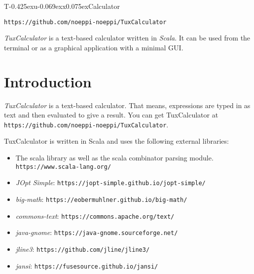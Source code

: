 \documentclass[10pt]{article}
\let\~=\allowbreak
\begin{document}
    \begin{center}
        {\Huge\fontsize{37pt}{37pt}\selectfont T\kern-0.425exu\kern-0.069exx\kern0.075exCalculator}
        
        \vspace*{24pt}
        \verb|https://github.com/noeppi-noeppi/TuxCalculator|
    \end{center}
    \vspace*{48pt}
    
    \textit{TuxCalculator} is a text-based calculator written in \textsl{Scala}.
    It can be used from the terminal or as a graphical application with a minimal GUI\@.
    \vspace*{12pt}
    
    \tableofcontents
    \clearpage
    
    \section{Introduction}\label{sec:introduction}
    \textit{TuxCalculator} is a text-based calculator.
    That means, expressions are typed in as text and then evaluated to give a result.
    You can get TuxCalculator at \verb|https://github.com/noeppi-noeppi/TuxCalculator|.
    
    TuxCalculator is written in Scala and uses the following external libraries:
    \begin{itemize}
        \item The scala library as well as the scala combinator parsing module.\\
              \texttt{https://\~www.scala-\~lang.org/}
        \item \textsl{JOpt Simple}: \texttt{https://\~jopt-\~simple.github.io\~/jopt-simple/}
        \item \textsl{big-math}: \texttt{https://\~eobermuhlner.github.io\~/big-math/}
        \item \textsl{commons-text}: \texttt{https://\~commons.apache.org\~/text/}
        \item \textsl{java-gnome}: \texttt{https://\~java\~-gnome.sourceforge.net/}
        \item \textsl{jline3}: \texttt{https://\~github.com\~/jline\~/jline3/}
        \item \textsl{jansi}: \texttt{https://\~fusesource.github.io\~/jansi/}
    \end{itemize}
    
\end{document}
